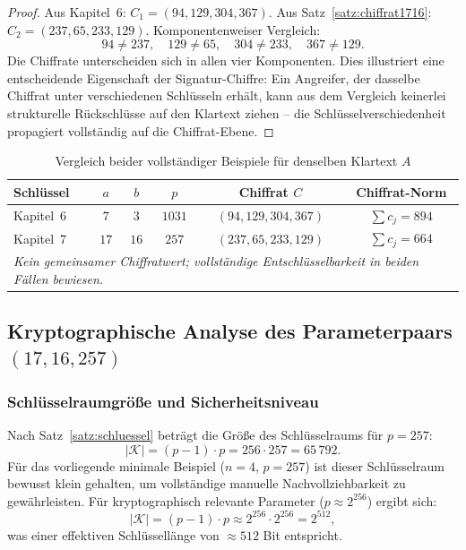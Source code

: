 ﻿\documentclass[a4paper,12pt]{scrreprt}
\theoremstyle{definition}
\begin{document}
\begin{proof}
Aus Kapitel~6: $C_1 = (94, 129, 304, 367)$. Aus Satz~\ref{satz:chiffrat1716}: $C_2 = (237, 65, 233, 129)$. Komponentenweiser Vergleich:
\[
94 \neq 237, \quad 129 \neq 65, \quad 304 \neq 233, \quad 367 \neq 129.
\]
Die Chiffrate unterscheiden sich in allen vier Komponenten. Dies illustriert eine entscheidende Eigenschaft der Signatur-Chiffre: Ein Angreifer, der dasselbe Chiffrat unter verschiedenen Schlüsseln erhält, kann aus dem Vergleich keinerlei strukturelle Rückschlüsse auf den Klartext ziehen -- die Schlüsselverschiedenheit propagiert vollständig auf die Chiffrat-Ebene.
\end{proof}

\begin{table}[H]
\centering
\caption{Vergleich beider vollständiger Beispiele für denselben Klartext $A$}
\label{tab:vergleich}
\begin{tabular}{@{}lccccc@{}}
\toprule
\textbf{Schlüssel} & $a$ & $b$ & $p$ & \textbf{Chiffrat $C$} & \textbf{Chiffrat-Norm} \\
\midrule
Kapitel~6 & $7$  & $3$  & $1031$ & $(94, 129, 304, 367)$ & $\sum c_j = 894$  \\
Kapitel~7 & $17$ & $16$ & $257$  & $(237, 65, 233, 129)$ & $\sum c_j = 664$  \\
\midrule
\multicolumn{6}{l}{\emph{Kein gemeinsamer Chiffratwert; vollständige Entschlüsselbarkeit in beiden Fällen bewiesen.}} \\
\bottomrule
\end{tabular}
\end{table}

\subsection{Kryptographische Analyse des Parameterpaars $(17, 16, 257)$}

\subsubsection{Schlüsselraumgröße und Sicherheitsniveau}

Nach Satz~\ref{satz:schluessel} beträgt die Größe des Schlüsselraums für $p = 257$:
\[
|\mathcal{K}| = (p-1) \cdot p = 256 \cdot 257 = 65\,792.
\]
Für das vorliegende minimale Beispiel ($n=4$, $p=257$) ist dieser Schlüsselraum bewusst klein gehalten, um vollständige manuelle Nachvollziehbarkeit zu gewährleisten. Für kryptographisch relevante Parameter ($p \approx 2^{256}$) ergibt sich:
\[
|\mathcal{K}| = (p-1) \cdot p \approx 2^{256} \cdot 2^{256} = 2^{512},
\]
was einer effektiven Schlüssellänge von $\approx 512$ Bit entspricht.
\end{document}
